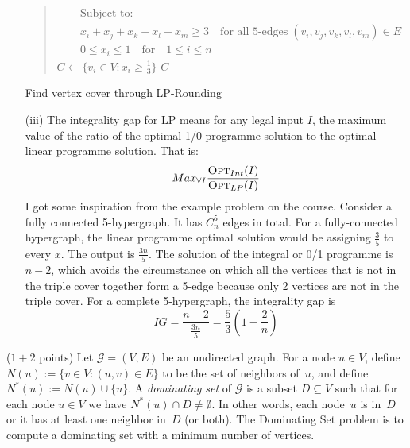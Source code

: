 \documentclass{article}
\newcommand{\G}{\ensuremath{\mathcal{G}}}
\newcommand{\graph}{\G}
\newcommand{\domset}{{\sc Dominating Set}\xspace}
\renewcommand{\leq}{\leqslant}
\renewcommand{\geq}{\geqslant}
\newcounter{rcounter}
\newenvironment{rlist}%
{\begin{list}{\setnr-\arabic{rcounter}}{\usecounter{rcounter}}}{\end{list}}
\begin{document}
\begin{rlist}
\begin{enumerate}
\begin{algorithm}
\begin{quotation}
\begin{algorithmic}[1]
\begin{eqnarray*}
                            &&\textrm{Subject to:}\\
                            && x_i+x_j+x_k+x_l+x_m \geq 3 \quad \textrm{for all 5-edges} \; (v_i, v_j, v_k, v_l, v_m) \in  E\\
                            && 0 \leq x_i \leq 1 \quad \textrm{for} \quad 1\leq i \leq n
                        \end{eqnarray*}
                        \State $C \gets \{v_i \in V: x_i \geq \frac{1}{3} \}$
                        \State \Return $C$
                    \end{algorithmic}
                \end{quotation}
                \caption{Find vertex cover through LP-Rounding}
            \end{algorithm}
            \item[(iii)] The integrality gap for LP means for any legal input $I$, the maximum value of the ratio of the optimal 1/0 programme
            solution to the optimal linear programme solution. That is:
            $$Max_{\forall{I}} \frac{\textrm{\sc Opt}_{Int}(I)}{\textrm{\sc Opt}_{LP}(I)}$$
            I got some inspiration from the example problem on the course. Consider a fully connected 5-hypergraph. It has $C_{n}^{5}$ edges in total.
            For a fully-connected hypergraph, the linear programme optimal solution would be assigning $\frac{3}{5}$ to every $x$. The output is 
            $\frac{3n}{5}$. The solution of the integral or 0/1 programme is $n-2$, which avoids the circumstance on which all the vertices
            that is not in the triple cover together form a 5-edge because only 2 vertices are not in the triple cover. For a complete 5-hypergraph,
            the integrality gap is
            $$IG=\frac{n-2}{\frac{3n}{5}} = \frac{5}{3} (1-\frac{2}{n})$$
        \end{enumerate}
		\item ($1+2$ points)
		Let $\graph=(V,E)$ be an undirected graph. For a node $u\in V$, define $N(u) := \{ v \in V: (u,v) \in E\}$ to be the set of neighbors of~$u$, and define $N^*(u) := N(u) \cup \{ u\}$. A \emph{dominating set} of $\graph$ is a subset $D\subseteq V$ such that for each node $u\in V$ we have $N^*(u) \cap D \neq \emptyset$. In other words, each node~$u$ is in~$D$ or it has at least one neighbor in~$D$ (or both). The \domset problem is to compute a dominating set with a minimum number of vertices.

\end{rlist}
\end{document}
